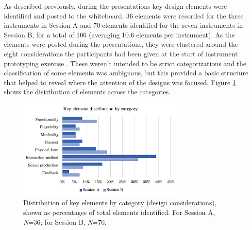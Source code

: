 \documentclass[letterpaper, 12pt]{article}
\begin{document}


As described previously, during the presentations key design elements were identified and posted to the whiteboard. 
36 elements were recorded for the three instruments in Session A and 70 elements identified for the seven instruments in Session B, for a total of 106 (averaging 10.6 elements per instrument). As the elements were posted during the presentations, they were clustered around the eight considerations the participants had been given at the start of instrument prototyping exercise . These weren't intended to be strict categorizations and the classification of some elements was ambiguous, but this provided a basic structure that helped to reveal where the attention of the designs was focused. Figure \ref{ch3-fig:key-elements-by-category} shows the distribution of elements across the categories. 

\begin{figure}[htbp]
    \centering
    \includegraphics[width=0.75\textwidth]{ch3_key_element_categories}
    \caption[Design for Performance workshop: Key elements by category]{Distribution of key elements by category (design considerations), shown as percentages of total elements identified. For Session A, \emph{N}=36; for Session B, \emph{N}=70.}
    \label{ch3-fig:key-elements-by-category}
\end{figure}
\end{document}
